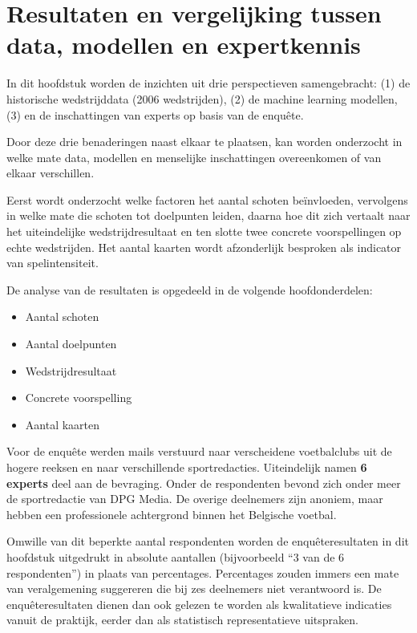 \chapter{Resultaten en vergelijking tussen data, modellen en expertkennis}
\label{ch:resultaten}

In dit hoofdstuk worden de inzichten uit drie perspectieven samengebracht:
(1) de historische wedstrijddata (2006 wedstrijden),
(2) de machine learning modellen,
(3) en de inschattingen van experts op basis van de enquête.

Door deze drie benaderingen naast elkaar te plaatsen, kan worden onderzocht in welke mate data, modellen en menselijke inschattingen overeenkomen of van elkaar verschillen.

Eerst wordt onderzocht welke factoren het aantal schoten beïnvloeden, vervolgens in welke mate die schoten tot doelpunten leiden,
daarna hoe dit zich vertaalt naar het uiteindelijke wedstrijdresultaat en ten slotte twee concrete voorspellingen op echte wedstrijden.
Het aantal kaarten wordt afzonderlijk besproken als indicator van spelintensiteit.

De analyse van de resultaten is opgedeeld in de volgende hoofdonderdelen:

\begin{itemize}
    \item Aantal schoten
    \item Aantal doelpunten
    \item Wedstrijdresultaat
    \item Concrete voorspelling
    \item Aantal kaarten
\end{itemize}

\vspace{5pt}

Voor de enquête werden mails verstuurd naar verscheidene voetbalclubs uit de hogere reeksen en naar verschillende sportredacties.
Uiteindelijk namen \textbf{6 experts} deel aan de bevraging.
Onder de respondenten bevond zich onder meer de sportredactie van DPG Media.
De overige deelnemers zijn anoniem, maar hebben een professionele achtergrond binnen het Belgische voetbal.

Omwille van dit beperkte aantal respondenten worden de enquêteresultaten in dit hoofdstuk uitgedrukt in absolute aantallen (bijvoorbeeld ``3 van de 6 respondenten'') in plaats van percentages.
Percentages zouden immers een mate van veralgemening suggereren die bij zes deelnemers niet verantwoord is.
De enquêteresultaten dienen dan ook gelezen te worden als kwalitatieve indicaties vanuit de praktijk, eerder dan als statistisch representatieve uitspraken.

